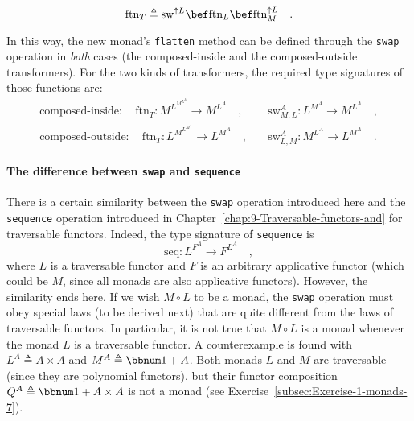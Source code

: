 ~\vspace{-0.35\baselineskip}
\begin{equation}
\text{ftn}_{T}\triangleq\text{sw}^{\uparrow L}\bef\text{ftn}_{L}\bef\text{ftn}_{M}^{\uparrow L}\quad.\label{eq:define-flatten-via-swap}
\end{equation}

\noindent In this way, the new monad\textsf{'}s \texttt{}\lstinline!flatten!
method can be defined through the \texttt{}\lstinline!swap! operation
in \emph{both} cases (the composed-inside and the composed-outside
transformers). For the two kinds of transformers, the required type
signatures of those functions are:
\begin{align*}
\text{composed-inside}:\quad\text{ftn}_{T}:M^{L^{M^{L^{A}}}}\rightarrow M^{L^{A}}\quad, & \quad\text{sw}_{M,L}^{A}:L^{M^{A}}\rightarrow M^{L^{A}}\quad,\\
\text{composed-outside}:\quad\text{ftn}_{T}:L^{M^{L^{M^{A}}}}\rightarrow L^{M^{A}}\quad, & \quad\text{sw}_{L,M}^{A}:M^{L^{A}}\rightarrow L^{M^{A}}\quad.
\end{align*}


\paragraph{The difference between \texttt{swap} and \texttt{sequence}}

There is a certain similarity between the \texttt{}\lstinline!swap!
operation introduced here and the \lstinline!sequence! operation
introduced in Chapter~\ref{chap:9-Traversable-functors-and} for
traversable functors. Indeed, the type signature of \lstinline!sequence!
is 
\[
\text{seq}:L^{F^{A}}\rightarrow F^{L^{A}}\quad,
\]
where $L$ is a traversable functor and $F$ is an arbitrary applicative
functor (which could be $M$, since all monads are also applicative
functors). However, the similarity ends here. If we wish $M\circ L$
to be a monad, the \texttt{}\lstinline!swap! operation must obey
special laws (to be derived next) that are quite different from the
laws of traversable functors. In particular, it is not true that $M\circ L$
is a monad whenever the monad $L$ is a traversable functor. A counterexample
is found with $L^{A}\triangleq A\times A$ and $M^{A}\triangleq\bbnum 1+A$.
Both monads $L$ and $M$ are traversable (since they are polynomial
functors), but their functor composition $Q^{A}\triangleq\bbnum 1+A\times A$
is not a monad (see Exercise~\ref{subsec:Exercise-1-monads-7}).

